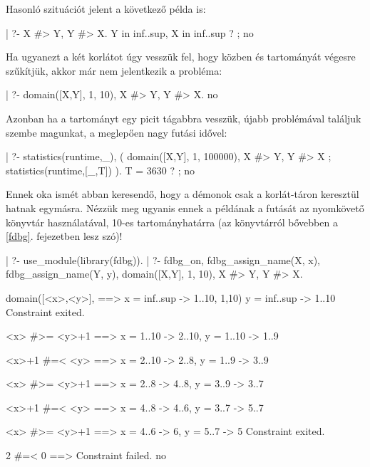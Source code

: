 Hasonló szituációt jelent a következő példa is:

\begin{prologcode}
| ?- X #> Y, Y #> X.
Y in inf..sup,
X in inf..sup ? ;
no
\end{prologcode}

Ha ugyanezt a két korlátot úgy vesszük fel, hogy közben  és  tartományát
végesre szűkítjük, akkor már nem jelentkezik a probléma:

\begin{prologcode}
| ?- domain([X,Y], 1, 10), X #> Y, Y #> X.
no
\end{prologcode}

Azonban ha a tartományt egy picit tágabbra vesszük, újabb problémával találjuk
szembe magunkat, a meglepően nagy futási idővel:

\begin{prologcode}
| ?- statistics(runtime,_),
     ( domain([X,Y], 1, 100000), X #> Y, Y #> X
     ; statistics(runtime,[_,T])
     ).
T = 3630 ? ;
no
\end{prologcode}

Ennek oka ismét abban keresendő, hogy a démonok csak a korlát-táron keresztül
hatnak egymásra. Nézzük meg ugyanis ennek a példának a futását az \fdbg
nyomkövető könyvtár használatával, 10-es tartományhatárra (az \fdbg könyvtárról
bővebben a \ref{fdbg}. fejezetben lesz szó)!

\begin{prologcode}
| ?- use_module(library(fdbg)).
| ?- fdbg_on, fdbg_assign_name(X, x), fdbg_assign_name(Y, y),
     domain([X,Y], 1, 10), X #> Y, Y #> X.

domain([<x>,<y>], ==> x = inf..sup -> 1..10,
       1,10)          y = inf..sup -> 1..10
                      Constraint exited.

<x> #>= <y>+1     ==> x = 1..10 -> 2..10,   y = 1..10 -> 1..9

<x>+1 #=< <y>     ==> x = 2..10 -> 2..8,    y = 1..9 -> 3..9

<x> #>= <y>+1     ==> x = 2..8 -> 4..8,     y = 3..9 -> 3..7

<x>+1 #=< <y>     ==> x = 4..8 -> 4..6,     y = 3..7 -> 5..7

<x> #>= <y>+1     ==> x = 4..6 -> {6},      y = 5..7 -> {5}
                      Constraint exited.

2 #=< 0           ==> Constraint failed.
no
\end{prologcode}

